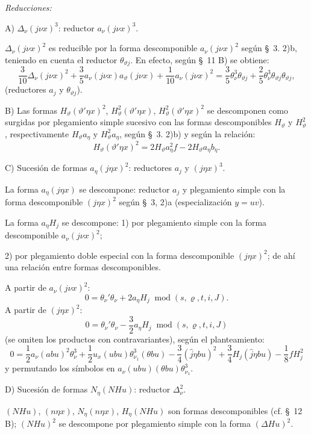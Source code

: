 \documentclass[11pt]{article}
\newcommand{\A}{\Delta}
\newcommand{\R}{\varrho}
\newcommand{\modu}[1]{\;\operatorname{mod} #1}
\begin{document}
\noindent\emph{Reducciones:}

\noindent A) $\A_\nu(j\nu x)^3$: reductor $a_\nu(j\nu x)^3$.

$\A_\nu(j\nu x)^2$ es reducible por la forma descomponible $a_\nu(j\nu x)^2$ según \S\ 3. 2)b, teniendo en cuenta el reductor $\theta_{\vartheta j}$. En efecto, según \S\ 11 B) se obtiene:
\[
\frac3{10}\A_\nu(j\nu x)^2+\frac35a_\nu(j\nu x)a_\vartheta(j\nu x)
+\frac1{10}a_\nu(j\nu x)^2
=\frac35\theta_\nu^3\theta_{\vartheta j}+\frac25\theta_\nu^3\theta_{\vartheta j}\theta_{\vartheta j},
\]
(reductores $a_j$ y $\theta_{\vartheta j}$).

\noindent B) Las formas $H_\vartheta(\vartheta'\eta x)^2$, $H_\vartheta^2(\vartheta'\eta x)$, $H_\vartheta^2(\vartheta'\eta x)^2$ se descomponen como surgidas por plegamiento simple sucesivo con las formas descomponibles $H_\vartheta$ y $H_\vartheta^2$, respectivamente $H_\vartheta a_\eta$ y $H_\vartheta^2a_\eta$, según \S\ 3. 2)b) y según la relación:
\[
H_\vartheta(\vartheta'\eta x)^2=2H_\vartheta a_\eta^2f-2H_\vartheta a_\eta b_\eta.
\]

\noindent C) Sucesión de formas $a_\eta(j\eta x)^2$: reductores $a_j$ y $(j\eta x)^3$.

La forma $a_\eta(j\eta x)$ se descompone: reductor $a_j$ y plegamiento simple con la forma descomponible $(j\eta x)^2$ según \S\ 3, 2)a (especialización $y=uv$).

La forma $a_\eta H_j$ se descompone: 1) por plegamiento simple con la forma descomponible $a_\nu(j\nu x)^2$;

2) por plegamiento doble especial con la forma descomponible $(j\eta x)^2$; de ahí una relación entre formas descomponibles.

A partir de $a_\nu(j\nu x)^2$:
\[
0=\theta_\nu'\theta_\nu+2a_\eta H_j\modu{(s,\R,t,i,J)}.
\]
A partir de $(j\eta x)^2$:
\[
0=\theta_\nu'\theta_\nu-\frac32a_\eta H_j\modu{(s,\R,t,i,J)}
\]
(se omiten los productos con contravariantes), según el planteamiento:
\[
0=\frac12a_\nu(abu)^2\theta_\nu^3
+\frac12u_x(ubu)\theta_{\nu_1}^3(\theta bu)
-\frac34(\widehat{j}\eta bu)^2+\frac34H_j(\widehat{j}\eta bu)
-\frac18fH_j^2
\]
y permutando los símbolos en $a_\nu(ubu)(\theta bu)\theta_{\nu_1}^3$.

\noindent D) Sucesión de formas $N_\eta(NHu)$: reductor $\A_\nu^2$.

$(NHu)$, $(n\eta x)$, $N_\eta(n\eta x)$, $H_\eta(NHu)$ son formas descomponibles (cf. \S\ 12 B); $(NHu)^2$ se descompone por plegamiento simple con la forma $(\A Hu)^2$.
\end{document}
